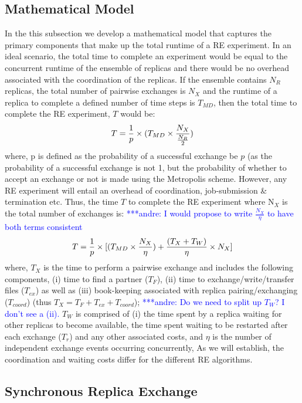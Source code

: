 \documentclass{rspublic}
\newcommand{\alnote}[1]{ {\textcolor{blue} { ***andre: #1 }}}
\newcommand{\alnote}[1]{}
\begin{document}
\subsection{Mathematical Model}

In the this subsection we develop a mathematical model that captures
the primary components that make up the total runtime of a RE
experiment. In an ideal scenario, the total time to complete an
experiment would be equal to the concurrent runtime of the ensemble of
replicas and there would be no overhead associated with the
coordination of the replicas.  If the ensemble contains $N_R$
replicas, the total number of pairwise exchanges is $N_X$ and the
runtime of a replica to complete a defined number of time steps is
$T_{MD}$, then the total time to complete the RE experiment, $T$ would
be:
\begin{eqnarray}
T = {1\over p} \times (T_{MD} \times  {N_X \over {N_R \over 2}}) 
\label{eq:totaltime}
\end{eqnarray}
where, p is defined as the probability of a successful exchange be $p$
(as the probability of a successful exchange is not 1, but the
probability of whether to accept an exchange or not is made using the
Metropolis scheme.  However, any RE experiment will entail an overhead
of coordination, job-submission \& termination etc. Thus, the time $T$
to complete the RE experiment where N$_X$ is the total number of
exchanges is:
\alnote{I would propose to write $\frac{N_X}{\eta}$ to have both terms consistent}
\begin{eqnarray}
  T = {1\over p} \times [(T_{MD} \times  {N_X \over {\eta}}) +
  {(T_{X} + T_{W}) \over \eta} \times N_X]
\label{eq:totaltime}
\end{eqnarray}
where, $T_{X}$ is the time to perform a pairwise exchange and includes
the following components, (i) time to find a partner ($T_F$), (ii)
time to exchange/write/transfer files ($T_{ex}$) as well as (iii)
book-keeping associated with replica pairing/exchanging ($T_{coord}$)
(thus $T_{X} = T_{F} + T_{ex}+T_{coord}$); \alnote{Do we need to split up
$T_{W}$? I don't see a (ii).}$T_W$ is comprised of (i)
the time spent by a replica waiting for other replicas to become
available, the time spent waiting to be restarted after each exchange
($T_r$) and any other associated costs, and $\eta$ is the number of
independent exchange events occurring concurrently, As we will
establish, the coordination and waiting costs differ for the different
RE algorithms.

\subsection{Synchronous Replica Exchange}
\end{document}
